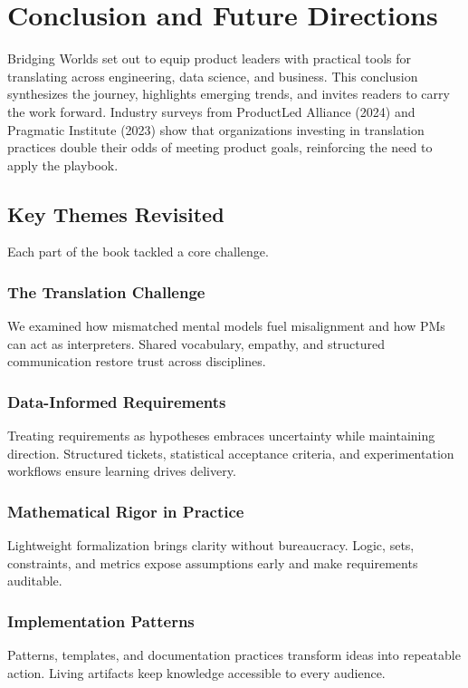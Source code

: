 \chapter{Conclusion and Future Directions}
\label{ch:conclusion}

Bridging Worlds set out to equip product leaders with practical tools for translating across engineering, data science, and business. This conclusion synthesizes the journey, highlights emerging trends, and invites readers to carry the work forward. Industry surveys from ProductLed Alliance (2024) and Pragmatic Institute (2023) show that organizations investing in translation practices double their odds of meeting product goals, reinforcing the need to apply the playbook.

\section{Key Themes Revisited}
\label{sec:key-themes}

Each part of the book tackled a core challenge.

\subsection{The Translation Challenge}
We examined how mismatched mental models fuel misalignment and how PMs can act as interpreters. Shared vocabulary, empathy, and structured communication restore trust across disciplines.

\subsection{Data-Informed Requirements}
Treating requirements as hypotheses embraces uncertainty while maintaining direction. Structured tickets, statistical acceptance criteria, and experimentation workflows ensure learning drives delivery.

\subsection{Mathematical Rigor in Practice}
Lightweight formalization brings clarity without bureaucracy. Logic, sets, constraints, and metrics expose assumptions early and make requirements auditable.

\subsection{Implementation Patterns}
Patterns, templates, and documentation practices transform ideas into repeatable action. Living artifacts keep knowledge accessible to every audience.

